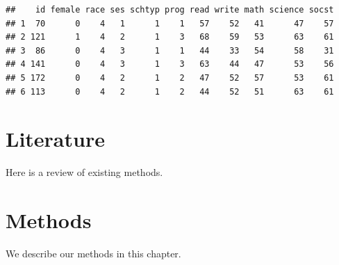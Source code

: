 \documentclass[]{book}
\begin{document}
\begin{verbatim}
##    id female race ses schtyp prog read write math science socst
## 1  70      0    4   1      1    1   57    52   41      47    57
## 2 121      1    4   2      1    3   68    59   53      63    61
## 3  86      0    4   3      1    1   44    33   54      58    31
## 4 141      0    4   3      1    3   63    44   47      53    56
## 5 172      0    4   2      1    2   47    52   57      53    61
## 6 113      0    4   2      1    2   44    52   51      63    61
\end{verbatim}

\chapter{Literature}\label{literature}

Here is a review of existing methods.

\chapter{Methods}\label{methods}

We describe our methods in this chapter.


\end{document}
